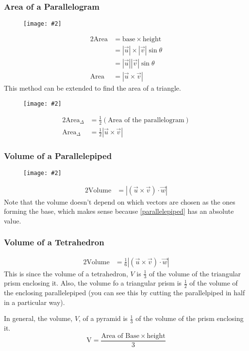 \documentclass{report}
\newcommand{\diagram}[2][0.5]{
	\begin{figure}[H]
		\centering
		\texttt{[image: \#2]}
	\end{figure}
	}
\theoremstyle{definition}
\numberwithin{equation}{section}
\begin{document}
\subsubsection*{Area of a Parallelogram}
\diagram{parallelogram}
\begin{alignat}{2}
	\mathrm{Area} &= \mathrm{base} \times \mathrm{height} \nonumber \\
								&= |\vec u| \times |\vec v| \sin \theta \nonumber \\
								&= |\vec u| |\vec v| \sin \theta \nonumber \\
	\mathrm{Area} &= |\vec u \times \vec v|
\end{alignat}
This method can be extended to find the area of a triangle.
\diagram{triangle}
\begin{alignat}{2}
	\mathrm{Area}_\Delta &= \frac{1}{2}(\textrm{Area of the parallelogram}) \nonumber \\
	\mathrm{Area}_\Delta &= \frac{1}{2} \left|\vec u \times \vec v\right|
\end{alignat}

\subsubsection*{Volume of a Parallelepiped}
\diagram{parallelepiped}
\begin{alignat}{2}
	\mathrm{Volume} &= \left|(\vec u \times \vec v) \cdot \vec w\right|
	\label{parallelepiped}
\end{alignat}
Note that the volume doesn't depend on which vectors are chosen as the ones forming the base, which makes sense because \eqref{parallelepiped} has an absolute value.

\subsubsection{Volume of a Tetrahedron}
\begin{alignat}{2}
	\mathrm{Volume} &= \frac{1}{6} \left|(\vec u \times \vec v) \cdot \vec w\right|
\end{alignat}
This is since the volume of a tetrahedron, $V$ is $\frac{1}{3}$ of the volume of the triangular prism enclosing it. Also, the volume fo a triangular prism is $\frac{1}{2}$ of the volume of the enclosing parallelepiped (you can see this by cutting the parallelpiped in half in a particular way).

In general, the volume, $V$, of a pyramid is $\frac{1}{3}$ of the volume of the prism enclosing it.
\begin{equation*}
	\mathrm{V} = \frac{\textrm{Area of Base} \times \mathrm{height}}{3}
\end{equation*}
\end{document}
